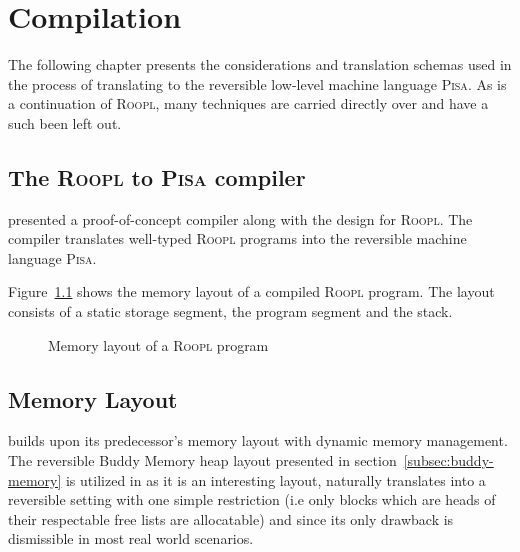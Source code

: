 \chapter{Compilation}
\label{chp:compilation}
The following chapter presents the considerations and translation schemas used in the process of translating \rooplpp to the reversible low-level machine language \textsc{Pisa}. As \rooplpp is a continuation of \textsc{Roopl}, many techniques are carried directly over and have a such been left out.

\section{The \textsc{Roopl} to \textsc{Pisa} compiler}
\label{sec:roopl-to-pisa-compiler}
\citeauthor{th:roopl} presented a proof-of-concept compiler along with the design for \textsc{Roopl}. The compiler translates well-typed \textsc{Roopl} programs into the reversible machine language \textsc{Pisa}.

Figure~\ref{fig:roopl-memory-layout} shows the memory layout of a compiled \textsc{Roopl} program. The layout consists of a static storage segment, the program segment and the stack. 
\begin{figure}[ht]
    \centering
    \caption{Memory layout of a \textsc{Roopl} program}
    \label{fig:roopl-memory-layout}
\end{figure}

\section{\rooplpp Memory Layout}
\label{sec:rooplpp-memory-layout}
\rooplpp builds upon its predecessor's memory layout with dynamic memory management. The reversible Buddy Memory heap layout presented in section~\ref{subsec:buddy-memory} is utilized in \rooplpp as it is an interesting layout, naturally translates into a reversible setting with one simple restriction (i.e only blocks which are heads of their respectable free lists are allocatable) and since its only drawback is dismissible in most real world scenarios.

